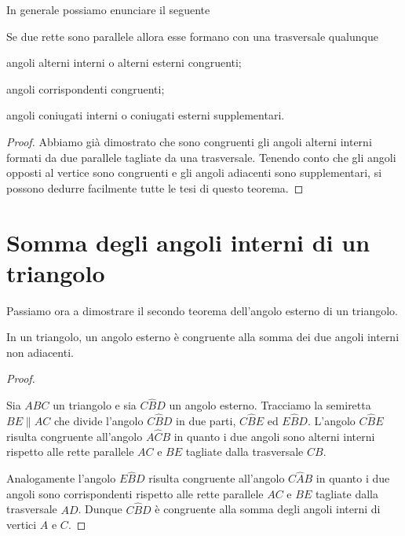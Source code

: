 In generale possiamo enunciare il seguente
\begin{teorema}
  Se due rette sono parallele allora esse formano con una trasversale 
  qualunque
  \begin{itemize*}
    \item angoli alterni interni o alterni esterni congruenti;
    \item angoli corrispondenti congruenti;
    \item angoli coniugati interni o coniugati esterni supplementari.
  \end{itemize*}
\end{teorema}

\begin{proof}
  Abbiamo già dimostrato che sono congruenti gli angoli alterni interni 
  formati da due parallele tagliate da una trasversale. Tenendo conto 
  che gli angoli opposti al vertice sono congruenti e gli angoli 
  adiacenti sono supplementari, si possono dedurre facilmente tutte le 
  tesi di questo teorema.
\end{proof}


\section{Somma degli angoli interni di un triangolo}
  \label{sect:angoli_interni_triangolo}

Passiamo ora a dimostrare il secondo teorema dell'angolo esterno di 
un triangolo.
\begin{teorema}
  In un triangolo, un angolo esterno è congruente alla somma dei due 
  angoli interni non adiacenti.
\end{teorema}

\begin{proof}
~

\begin{minipage}{.49\textwidth}
  Sia $ABC$ un triangolo e sia $C\widehat{B}D$ un angolo esterno. 
  Tracciamo la semiretta $BE\parallel AC$ che divide l'angolo 
  $C\widehat{B}D$ in due parti, $C\widehat{B}E$ ed $E\widehat{B}D$. 
  L'angolo $C\widehat{B}E$ risulta congruente all'angolo 
  $A\widehat{C}B$ in quanto i due angoli sono alterni interni rispetto 
  alle rette parallele $AC$ e $BE$ tagliate dalla trasversale $CB$. 
\end{minipage}
\begin{minipage}{.49\textwidth}
\begin{inaccessibleblock}
    \begin{center}\end{center}
\end{inaccessibleblock}
\end{minipage}
  Analogamente l'angolo $E\widehat{B}D$ risulta congruente all'angolo 
  $C\widehat{A}B$ in quanto i due angoli sono corrispondenti rispetto 
  alle rette parallele $AC$ e $BE$ tagliate dalla trasversale $AD$. 
  Dunque $C\widehat{B}D$ è congruente alla somma degli angoli interni 
  di vertici $A$ e $C$.
\end{proof}

